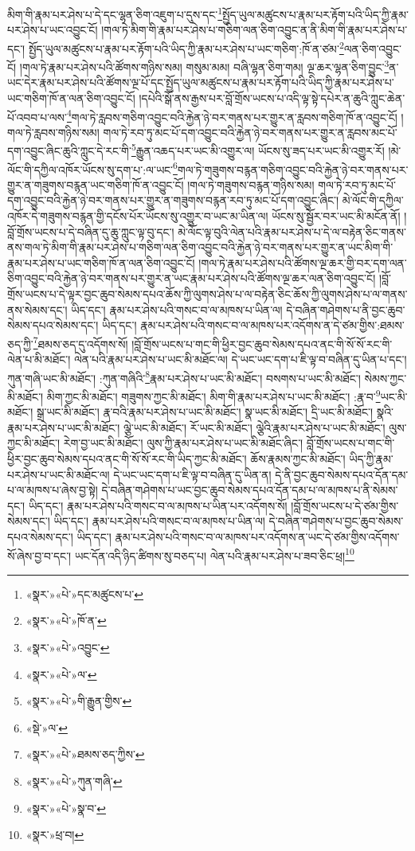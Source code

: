 མིག་གི་རྣམ་པར་ཤེས་པ་དེ་དང་ལྷན་ཅིག་འཇུག་པ་དུས་དང་\footnote{«སྣར་»«པེ་»དང་མཚུངས་པ་}སྤྱོད་ཡུལ་མཚུངས་པ་རྣམ་པར་རྟོག་པའི་ཡིད་ཀྱི་རྣམ་པར་ཤེས་པ་ཡང་འབྱུང་ངོ། །གལ་ཏེ་མིག་གི་རྣམ་པར་ཤེས་པ་གཅིག་ལན་ཅིག་འབྱུང་ན་ནི་མིག་གི་རྣམ་པར་ཤེས་པ་དང་། སྤྱོད་ཡུལ་མཚུངས་པ་རྣམ་པར་རྟོག་པའི་ཡིད་ཀྱི་རྣམ་པར་ཤེས་པ་ཡང་གཅིག་:ཁོ་ན་ཙམ་\footnote{«སྣར་»«པེ་»ཁོ་ན་}ལན་ཅིག་འབྱུང་ངོ། །གལ་ཏེ་རྣམ་པར་ཤེས་པའི་ཚོགས་གཉིས་སམ། གསུམ་མམ། བཞི་ལྷན་ཅིག་གམ། ལྔ་ཆར་ལྷན་ཅིག་བྱུང་\footnote{«སྣར་»«པེ་»འབྱུང་}ན་ཡང་དེར་རྣམ་པར་ཤེས་པའི་ཚོགས་ལྔ་པོ་དང་སྤྱོད་ཡུལ་མཚུངས་པ་རྣམ་པར་རྟོག་པའི་ཡིད་ཀྱི་རྣམ་པར་ཤེས་པ་ཡང་གཅིག་ཁོ་ན་ལན་ཅིག་འབྱུང་ངོ། །དཔེའི་སྒོ་ནས་རྒྱས་པར་བློ་གྲོས་ཡངས་པ་འདི་ལྟ་སྟེ་དཔེར་ན་ཆུའི་ཀླུང་ཆེན་པོ་འབབ་པ་ལས་\footnote{«སྣར་»«པེ་»ལ་}གལ་ཏེ་རླབས་གཅིག་འབྱུང་བའི་རྐྱེན་ཉེ་བར་གནས་པར་གྱུར་ན་རླབས་གཅིག་ཁོ་ན་འབྱུང་ངོ། །གལ་ཏེ་རླབས་གཉིས་སམ། གལ་ཏེ་རབ་ཏུ་མང་པོ་དག་འབྱུང་བའི་རྐྱེན་ཉེ་བར་གནས་པར་གྱུར་ན་རླབས་མང་པོ་དག་འབྱུང་ཞིང་ཆུའི་ཀླུང་དེ་རང་གི་\footnote{«སྣར་»«པེ་»གི་རྒྱུན་གྱིས་}རྒྱུན་འཆད་པར་ཡང་མི་འགྱུར་ལ། ཡོངས་སུ་ཟད་པར་ཡང་མི་འགྱུར་རོ། །མེ་ལོང་གི་དཀྱིལ་འཁོར་ཡོངས་སུ་དག་པ་:ལ་ཡང་\footnote{«སྡེ་»ལ་}གལ་ཏེ་གཟུགས་བརྙན་གཅིག་འབྱུང་བའི་རྐྱེན་ཉེ་བར་གནས་པར་གྱུར་ན་གཟུགས་བརྙན་ཡང་གཅིག་ཁོ་ན་འབྱུང་ངོ། །གལ་ཏེ་གཟུགས་བརྙན་གཉིས་སམ། གལ་ཏེ་རབ་ཏུ་མང་པོ་དག་འབྱུང་བའི་རྐྱེན་ཉེ་བར་གནས་པར་གྱུར་ན་གཟུགས་བརྙན་རབ་ཏུ་མང་པོ་དག་འབྱུང་ཞིང་། མེ་ལོང་གི་དཀྱིལ་འཁོར་དེ་གཟུགས་བརྙན་གྱི་དངོས་པོར་ཡོངས་སུ་འགྱུར་བ་ཡང་མ་ཡིན་ལ། ཡོངས་སུ་སྦྱོར་བར་ཡང་མི་མངོན་ནོ། །བློ་གྲོས་ཡངས་པ་དེ་བཞིན་དུ་ཆུ་ཀླུང་ལྟ་བུ་དང་། མེ་ལོང་ལྟ་བུའི་ལེན་པའི་རྣམ་པར་ཤེས་པ་དེ་ལ་བརྟེན་ཅིང་གནས་ནས་གལ་ཏེ་མིག་གི་རྣམ་པར་ཤེས་པ་གཅིག་ལན་ཅིག་འབྱུང་བའི་རྐྱེན་ཉེ་བར་གནས་པར་གྱུར་ན་ཡང་མིག་གི་རྣམ་པར་ཤེས་པ་ཡང་གཅིག་ཁོ་ན་ལན་ཅིག་འབྱུང་ངོ། །གལ་ཏེ་རྣམ་པར་ཤེས་པའི་ཚོགས་ལྔ་ཆར་གྱི་བར་དག་ལན་ཅིག་འབྱུང་བའི་རྐྱེན་ཉེ་བར་གནས་པར་གྱུར་ན་ཡང་རྣམ་པར་ཤེས་པའི་ཚོགས་ལྔ་ཆར་ལན་ཅིག་འབྱུང་ངོ། །བློ་གྲོས་ཡངས་པ་དེ་ལྟར་བྱང་ཆུབ་སེམས་དཔའ་ཆོས་ཀྱི་ལུགས་ཤེས་པ་ལ་བརྟེན་ཅིང་ཆོས་ཀྱི་ལུགས་ཤེས་པ་ལ་གནས་ནས་སེམས་དང་། ཡིད་དང་། རྣམ་པར་ཤེས་པའི་གསང་བ་ལ་མཁས་པ་ཡིན་ལ། དེ་བཞིན་གཤེགས་པ་ནི་བྱང་ཆུབ་སེམས་དཔའ་སེམས་དང་། ཡིད་དང་། རྣམ་པར་ཤེས་པའི་གསང་བ་ལ་མཁས་པར་འདོགས་ན་དེ་ཙམ་གྱིས་:ཐམས་ཅད་ཀྱི་\footnote{«སྣར་»«པེ་»ཐམས་ཅད་ཀྱིས་}ཐམས་ཅད་དུ་འདོགས་སོ། །བློ་གྲོས་ཡངས་པ་གང་གི་ཕྱིར་བྱང་ཆུབ་སེམས་དཔའ་ནང་གི་སོ་སོ་རང་གི་ལེན་པ་མི་མཐོང་། ལེན་པའི་རྣམ་པར་ཤེས་པ་ཡང་མི་མཐོང་ལ། དེ་ཡང་ཡང་དག་པ་ཇི་ལྟ་བ་བཞིན་དུ་ཡིན་པ་དང་། ཀུན་གཞི་ཡང་མི་མཐོང་། :ཀུན་གཞིའི་\footnote{«སྣར་»«པེ་»ཀུན་གཞི་}རྣམ་པར་ཤེས་པ་ཡང་མི་མཐོང་། བསགས་པ་ཡང་མི་མཐོང་། སེམས་ཀྱང་མི་མཐོང་། མིག་ཀྱང་མི་མཐོང་། གཟུགས་ཀྱང་མི་མཐོང་། མིག་གི་རྣམ་པར་ཤེས་པ་ཡང་མི་མཐོང་། :རྣ་བ་\footnote{«སྣར་»«པེ་»སྣ་བ་}ཡང་མི་མཐོང་། སྒྲ་ཡང་མི་མཐོང་། རྣ་བའི་རྣམ་པར་ཤེས་པ་ཡང་མི་མཐོང་། སྣ་ཡང་མི་མཐོང་། དྲི་ཡང་མི་མཐོང་། སྣའི་རྣམ་པར་ཤེས་པ་ཡང་མི་མཐོང་། ལྕེ་ཡང་མི་མཐོང་། རོ་ཡང་མི་མཐོང་། ལྕེའི་རྣམ་པར་ཤེས་པ་ཡང་མི་མཐོང་། ལུས་ཀྱང་མི་མཐོང་། རེག་བྱ་ཡང་མི་མཐོང་། ལུས་ཀྱི་རྣམ་པར་ཤེས་པ་ཡང་མི་མཐོང་ཞིང་། བློ་གྲོས་ཡངས་པ་གང་གི་ཕྱིར་བྱང་ཆུབ་སེམས་དཔའ་ནང་གི་སོ་སོ་རང་གི་ཡིད་ཀྱང་མི་མཐོང་། ཆོས་རྣམས་ཀྱང་མི་མཐོང་། ཡིད་ཀྱི་རྣམ་པར་ཤེས་པ་ཡང་མི་མཐོང་ལ། དེ་ཡང་ཡང་དག་པ་ཇི་ལྟ་བ་བཞིན་དུ་ཡིན་ན། དེ་ནི་བྱང་ཆུབ་སེམས་དཔའ་དོན་དམ་པ་ལ་མཁས་པ་ཞེས་བྱ་སྟེ། དེ་བཞིན་གཤེགས་པ་ཡང་བྱང་ཆུབ་སེམས་དཔའ་དོན་དམ་པ་ལ་མཁས་པ་ནི་སེམས་དང་། ཡིད་དང་། རྣམ་པར་ཤེས་པའི་གསང་བ་ལ་མཁས་པ་ཡིན་པར་འདོགས་སོ། །བློ་གྲོས་ཡངས་པ་དེ་ཙམ་གྱིས་སེམས་དང་། ཡིད་དང་། རྣམ་པར་ཤེས་པའི་གསང་བ་ལ་མཁས་པ་ཡིན་ལ། དེ་བཞིན་གཤེགས་པ་བྱང་ཆུབ་སེམས་དཔའ་སེམས་དང་། ཡིད་དང་། རྣམ་པར་ཤེས་པའི་གསང་བ་ལ་མཁས་པར་འདོགས་ན་ཡང་དེ་ཙམ་གྱིས་འདོགས་སོ་ཞེས་བྱ་བ་དང་། ཡང་དོན་འདི་ཉིད་ཚིགས་སུ་བཅད་པ། ལེན་པའི་རྣམ་པར་ཤེས་པ་ཟབ་ཅིང་ཕྲ།\footnote{«སྣར་»ཕྲ་བ།} 